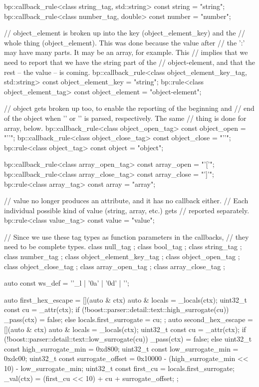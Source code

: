 \begin{code}
{    bp::callback_rule<class string_tag, std::string> const string = "string";
    bp::callback_rule<class number_tag, double> const number = "number";

    // object_element is broken up into the key (object_element_key) and the
    // whole thing (object_element).  This was done because the value after
    // the ':' may have many parts.  It may be an array, for example.  This
    // implies that we need to report that we have the string part of the
    // object-element, and that the rest -- the value -- is coming.
    bp::callback_rule<class object_element_key_tag, std::string> const
        object_element_key = "string";
    bp::rule<class object_element_tag> const object_element = "object-element";

    // object gets broken up too, to enable the reporting of the beginning and
    // end of the object when '{' or '}' is parsed, respectively.  The same
    // thing is done for array, below.
    bp::callback_rule<class object_open_tag> const object_open = "'{'";
    bp::callback_rule<class object_close_tag> const object_close = "'}'";
    bp::rule<class object_tag> const object = "object";

    bp::callback_rule<class array_open_tag> const array_open = "'['";
    bp::callback_rule<class array_close_tag> const array_close = "']'";
    bp::rule<class array_tag> const array = "array";

    // value no longer produces an attribute, and it has no callback either.
    // Each individual possible kind of value (string, array, etc.) gets
    // reported separately.
    bp::rule<class value_tag> const value = "value";


    // Since we use these tag types as function parameters in the callbacks,
    // they need to be complete types.
    class null_tag {};
    class bool_tag {};
    class string_tag {};
    class number_tag {};
    class object_element_key_tag {};
    class object_open_tag {};
    class object_close_tag {};
    class array_open_tag {};
    class array_close_tag {};


    auto const ws_def = ''_l | '\x0a' | '\x0d' | '';

    auto first_hex_escape = [](auto & ctx) {
        auto & locals = _locals(ctx);
        uint32_t const cu = _attr(ctx);
        if (!boost::parser::detail::text::high_surrogate(cu))
            _pass(ctx) = false;
        else
            locals.first_surrogate = cu;
    };
    auto second_hex_escape = [](auto & ctx) {
        auto & locals = _locals(ctx);
        uint32_t const cu = _attr(ctx);
        if (!boost::parser::detail::text::low_surrogate(cu)) {
            _pass(ctx) = false;
        } else {
            uint32_t const high_surrogate_min = 0xd800;
            uint32_t const low_surrogate_min = 0xdc00;
            uint32_t const surrogate_offset =
                0x10000 - (high_surrogate_min << 10) - low_surrogate_min;
            uint32_t const first_cu = locals.first_surrogate;
            _val(ctx) = (first_cu << 10) + cu + surrogate_offset;
        }
    };

}
\end{code}
